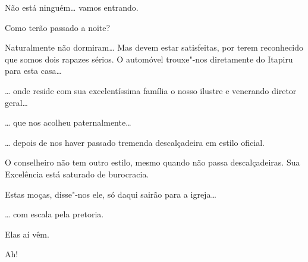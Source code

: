  Não está ninguém\ldots{} vamos entrando. 

 Como terão passado a noite?

 Naturalmente não dormiram\ldots{} Mas devem estar satisfeitas, por
terem reconhecido que somos dois rapazes sérios. O automóvel trouxe"-nos
diretamente do Itapiru para esta casa\ldots

 \ldots{} onde reside com sua excelentíssima
família o nosso ilustre e venerando diretor geral\ldots

 \ldots{} que nos acolheu paternalmente\ldots

 \ldots{} depois de nos haver passado tremenda descalçadeira em
estilo oficial.

 O conselheiro não tem outro estilo, mesmo quando não passa
descalçadeiras. Sua Excelência está saturado de burocracia.

 Estas moças, disse"-nos ele, só daqui sairão para a igreja\ldots

 \ldots{} com escala pela pretoria.

 Elas aí vêm.

 Ah!


